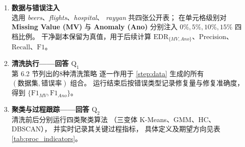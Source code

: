\documentclass[10pt]{article} %
\numberwithin{equation}{section}
\begin{document}
\begin{enumerate}[label=\textbf{Step\,\arabic*.},itemindent=4em,leftmargin=0pt]

\item \textbf{数据与错误注入}\label{step:data}\\
      选用 \textit{beers}、\textit{flights}、\textit{hospital}、
      \textit{rayyan} 共四张公开表；
      在单元格级别对
      \textbf{Missing Value (MV)} 与
      \textbf{Anomaly (Ano)} 分别注入
      \(0\%,5\%,10\%,15\%\) 四档比例。
      干净副本保留为真值，用于后续计算
      \(\mathrm{EDR}_{\{MV,Ano\}}\)、\(\mathrm{Precision}\)、
      \(\mathrm{Recall}\)、\(\mathrm{F1}\)。

\item \textbf{清洗执行——回答 \(\mathrm{Q_1}\)}\\
      第 6.2 节列出的8种清洗策略
      逐一作用于 \ref{step:data} 生成的所有
      \((\text{数据集},\text{错误率})\) 组合。
      运行结束后按错误类型记录修复量与修复准确度，得到
      \(\{\mathrm{F1}_{MV},\mathrm{F1}_{Ano}\}\)。

\item \textbf{聚类与过程跟踪——回答 \(\mathrm{Q_2}\)}\\
      清洗前后分别运行四类聚类算法
      （三变体 K-Means、GMM、HC、DBSCAN），
      并实时记录其关键过程指标，
      具体定义及期望方向见表 \ref{tab:proc_indicators}。  %


\end{enumerate}
\end{document}
